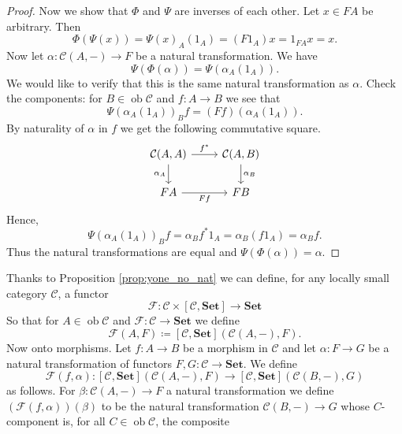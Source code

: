\documentclass{report}
\newcommand{\mbold}[1]{\mathrm{\mathbf{#1}}}
\DeclareMathOperator{\ob}{ob}
\theoremstyle{definition}
\theoremstyle{plain}
\theoremstyle{definition}
\begin{document}
\begin{proof}
			Now we show that $\Phi$ and $\Psi$ are inverses of each other. Let $x\in FA$ be arbitrary. Then
			\[
				\Phi (\Psi(x)) = \Psi(x)_A(1_A) = (F1_A)x = 1_{FA}x = x.
			\] 
			Now let $\alpha\colon \mathcal{C}(A,-) \to F$ be a natural transformation. We have
			\[
				\Psi(\Phi(\alpha)) = \Psi(\alpha_A(1_A)).
			\]	
			We would like to verify that this is the same natural transformation as $\alpha$. Check the components: for $B\in\ob\mathcal{C}$ and $f\colon A \to B$ we see that  
			\[
				\Psi(\alpha_A(1_A))_Bf=(Ff)(\alpha_A(1_A)).
			\]
			By naturality of $\alpha$ in $f$ we get the following commutative square.
			\[\begin{tikzcd}
				{\mathcal{C}(A,A)} & {\mathcal{C}(A,B)} \\
				FA & FB
				\arrow["{f^*}", from=1-1, to=1-2]
				\arrow["Ff"', from=2-1, to=2-2]
				\arrow["{\alpha_A}"', from=1-1, to=2-1]
				\arrow["{\alpha_B}", from=1-2, to=2-2]
			\end{tikzcd}\]
			Hence,
			\[
				\Psi(\alpha_A(1_A))_Bf = \alpha_Bf^*1_A = \alpha_B(f1_A) = \alpha_Bf.
			\]
			Thus the natural transformations are equal and $\Psi(\Phi(\alpha)) = \alpha$.
		\end{proof}
		Thanks to Proposition \ref{prop:yone_no_nat} we can define, for any locally small category $\mathcal{C}$, a functor 
		\[\mathscr{F} \colon \mathcal{C}\times [\mathcal{C}, \mbold{Set}] \to \mbold{Set}\]
		So that for $A\in\ob\mathcal{C}$ and $\mathscr{F}\colon\mathcal{C}\to\mbold{Set}$ we define
		\[
			\mathscr{F}(A,F) \coloneqq [\mathcal{C},\mbold{Set}](\mathcal{C}(A,-),F).
		\]
		Now onto morphisms. Let $f\colon A \to B$ be a morphism in $\mathcal{C}$ and let $\alpha\colon F \to G$ be a natural transformation of functors $F,G\colon \mathcal{C}\to \mbold{Set}$. We define
		\[
			\mathscr{F}(f,\alpha) \colon [\mathcal{C},\mbold{Set}](\mathcal{C}(A,-), F) \to [\mathcal{C},\mbold{Set}](\mathcal{C}(B,-), G)
		\]
		as follows. For $\beta\colon \mathcal{C}(A,-) \to F$ a natural transformation we define $(\mathscr{F}(f,\alpha))(\beta)$ to be the natural transformation $\mathcal{C}(B,-) \to G$ whose $C$-component is, for all $C\in\ob\mathcal{C}$, the composite
\end{document}
